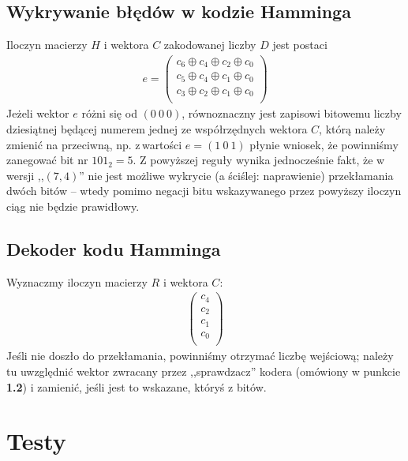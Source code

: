 \documentclass[a4paper,11pt]{article}
\begin{document}
  \subsection{Wykrywanie błędów w kodzie Hamminga}
  Iloczyn macierzy $H$ i wektora $C$ zakodowanej liczby $D$ jest postaci
  \begin{gather*}
    e = \begin{pmatrix}
      c_6 \oplus c_4 \oplus c_2 \oplus c_0 \\
      c_5 \oplus c_4 \oplus c_1 \oplus c_0 \\
      c_3 \oplus c_2 \oplus c_1 \oplus c_0 \\
    \end{pmatrix}
  \end{gather*}
  Jeżeli wektor $e$ różni się od $(0\ 0\ 0)$, równoznaczny jest zapisowi bitowemu liczby dziesiątnej będącej numerem jednej ze współrzędnych wektora $C$, którą należy zmienić na przeciwną, np. z\,wartości $e = (1\ 0\ 1)$ płynie wniosek, że powinniśmy zanegować bit nr $101_2=5$.
  Z powyższej reguły wynika jednocześnie fakt, że w wersji ,,$(7,4)$'' nie jest możliwe wykrycie (a ściślej: naprawienie) przekłamania dwóch bitów -- wtedy pomimo negacji bitu wskazywanego przez powyższy iloczyn ciąg nie będzie prawidłowy.
  \subsection{Dekoder kodu Hamminga}
  Wyznaczmy iloczyn macierzy $R$ i wektora $C$:
  \begin{gather*}
    \begin{pmatrix}
      c_4 \\
      c_2 \\
      c_1 \\
      c_0 \\
    \end{pmatrix}
  \end{gather*}
  Jeśli nie doszło do przekłamania, powinniśmy otrzymać liczbę wejściową; należy tu uwzględnić wektor zwracany przez ,,sprawdzacz'' kodera (omówiony w punkcie \textbf{1.2}) i zamienić, jeśli jest to wskazane, któryś z bitów.

  \section{Testy}
\end{document}
